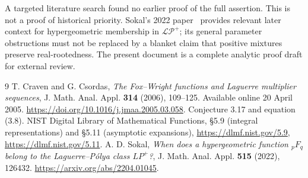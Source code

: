 \documentclass[11pt,a4paper]{article}
\newcommand{\LP}{\mathcal{LP}^{+}}
\begin{document}
A targeted literature search found no earlier proof of the full assertion.
This is not a proof of historical priority. Sokal's 2022 paper~\cite{Sokal}
provides relevant later context for hypergeometric membership in $\LP$;
its general parameter obstructions must not be replaced by a blanket
claim that positive mixtures preserve real-rootedness.
The present document is a complete analytic proof draft for external review.

\begin{thebibliography}{9}
 T. Craven and G. Csordas,
\emph{The Fox--Wright functions and Laguerre multiplier sequences},
J. Math. Anal. Appl. \textbf{314} (2006), 109--125.
Available online 20 April 2005.
\url{https://doi.org/10.1016/j.jmaa.2005.03.058}.
Conjecture 3.17 and equation (3.8).
 NIST Digital Library of Mathematical Functions,
\S5.9 (integral representations) and \S5.11 (asymptotic expansions),
\url{https://dlmf.nist.gov/5.9},
\url{https://dlmf.nist.gov/5.11}.
 A. D. Sokal,
\emph{When does a hypergeometric function ${}_pF_q$ belong to the
Laguerre--P\'olya class $LP^+$?},
J. Math. Anal. Appl. \textbf{515} (2022), 126432.
\url{https://arxiv.org/abs/2204.01045}.
\end{thebibliography}
\end{document}
